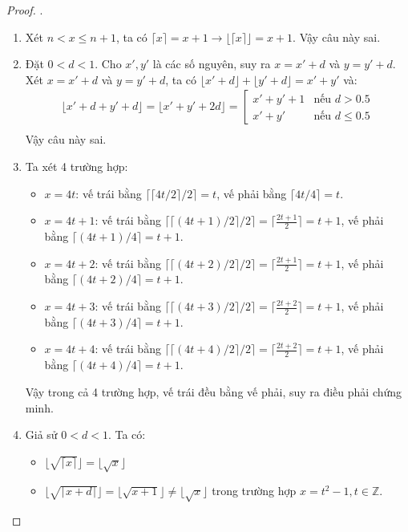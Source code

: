 \begin{proof}.
    \begin{enumerate}[label=\alph*)]
        \item Xét $n<x\leq n+1$, ta có $\lceil x\rceil=x+1\rightarrow\lfloor\lceil x\rceil\rfloor=x+1$. Vậy câu này sai.
        \item Đặt $0<d<1$. Cho $x',y'$ là các số nguyên, suy ra $x=x'+d$ và $y=y'+d$. Xét $x=x'+d$ và $y=y'+d$, ta có $\lfloor x'+d\rfloor+\lfloor y'+d\rfloor=x'+y'$ và:
            \begin{align*}
                \lfloor x'+d+y'+d\rfloor=\lfloor x'+y'+2d\rfloor=
                \left[
                \begin{array}{ll}
                    x'+y'+1 & \text{nếu $d>0.5$}\\
                    x'+y' & \text{nếu $d\leq0.5$}
                \end{array}
                \right .\\
            \end{align*}
        Vậy câu này sai.
        \item Ta xét 4 trường hợp: \begin{itemize}
            \item $x=4t$: vế trái bằng $\lceil\lceil4t/2\rceil/2\rceil=t$, vế phải bằng $\lceil4t/4\rceil=t$.
            \item $x=4t+1$: vế trái bằng $\lceil\lceil(4t+1)/2\rceil/2\rceil=\lceil\frac{2t+1}{2}\rceil=t+1$, vế phải bằng $\lceil(4t+1)/4\rceil=t+1$.
            \item $x=4t+2$: vế trái bằng $\lceil\lceil(4t+2)/2\rceil/2\rceil=\lceil\frac{2t+1}{2}\rceil=t+1$, vế phải bằng $\lceil(4t+2)/4\rceil=t+1$.
            \item $x=4t+3$: vế trái bằng $\lceil\lceil(4t+3)/2\rceil/2\rceil=\lceil\frac{2t+2}{2}\rceil=t+1$, vế phải bằng $\lceil(4t+3)/4\rceil=t+1$.
            \item $x=4t+4$: vế trái bằng $\lceil\lceil(4t+4)/2\rceil/2\rceil=\lceil\frac{2t+2}{2}\rceil=t+1$, vế phải bằng $\lceil(4t+4)/4\rceil=t+1$.
        \end{itemize}
        Vậy trong cả 4 trường hợp, vế trái đều bằng vế phải, suy ra điều phải chứng minh.
        \item Giả sử $0<d<1$. Ta có: \begin{itemize}
            \item $\lfloor\sqrt{\lceil x\rceil}\rfloor=\lfloor\sqrt x\rfloor$
            \item $\lfloor\sqrt{\lceil x+d\rceil}\rfloor=\lfloor\sqrt{x+1}\rfloor\neq \lfloor\sqrt x\rfloor$ trong trường hợp $x=t^2-1,t\in\mathbb{Z}$.

\end{itemize}
\end{enumerate}
\end{proof}
